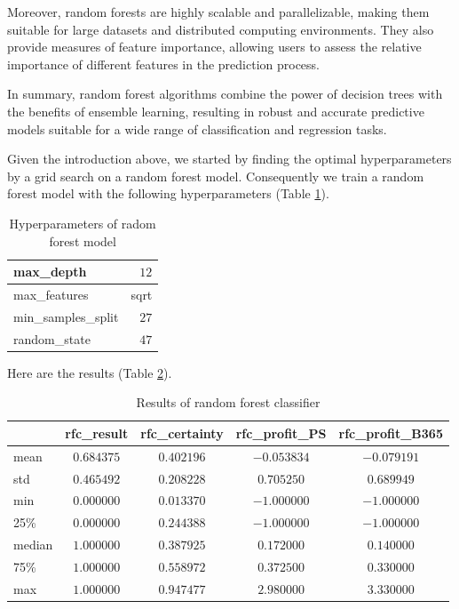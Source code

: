 \documentclass[preprint,aps,nofootinbib,a4paper,superscriptaddress,longbibliography,amsfonts,amssymb,amsmath,titlepage]{revtex4-2}
\begin{document}
Moreover, random forests are highly scalable and parallelizable, making them suitable for large datasets and distributed computing environments. They also provide measures of feature importance, allowing users to assess the relative importance of different features in the prediction process.

In summary, random forest algorithms combine the power of decision trees with the benefits of ensemble learning, resulting in robust and accurate predictive models suitable for a wide range of classification and regression tasks.

Given the introduction above, we started by finding the optimal hyperparameters by a grid search on a random forest model. Consequently we train a random forest model with the following hyperparameters (Table \ref{rfc-hyperparameter}).
%
\begin{table}[h]
\centering
\caption{Hyperparameters of radom forest model}
\begin{tabular}{l|r}
max\_depth & $12$ \\
\hline
max\_features & sqrt \\
\hline
min\_samples\_split & $27$ \\
\hline
random\_state & $47$ \\
\end{tabular}

\label{rfc-hyperparameter}
\end{table}
%
Here are the results (Table \ref{rfc-result}).
%
\begin{table}[h]
\centering
\caption{Results of random forest classifier}
\begin{tabular}{|l|c|c|c|c|}
\hline
& \textbf{rfc\_result} & \textbf{rfc\_certainty} & \textbf{rfc\_profit\_PS}& \textbf{rfc\_profit\_B365} \\
\hline
mean & $0.684375$ & $0.402196$ & $-0.053834$ & $-0.079191$ \\
\hline
std & $0.465492$ & $0.208228$ & $0.705250	$ & $0.689949$ \\
\hline
min & $0.000000$ & $0.013370$ & $-1.000000$ & $-1.000000$ \\
\hline
25\% & $0.000000$ & $0.244388$ & $-1.000000$ & $-1.000000$ \\
\hline
median & $1.000000$ & $0.387925$ & $0.172000$ & $0.140000$ \\
\hline
75\% & $1.000000$ & $0.558972$ & $0.372500$ & $0.330000$ \\
\hline
max & $1.000000$ & $0.947477$ & $2.980000$ & $3.330000$ \\
\hline
\end{tabular}

\label{rfc-result}
\end{table}
%
\end{document}
